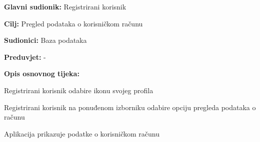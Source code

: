 				
				\noindent {}
				\begin{packed_item}
					
					\item \textbf{Glavni sudionik:} Registrirani korisnik
					\item  \textbf{Cilj:} Pregled podataka o korisničkom računu
					\item  \textbf{Sudionici:} Baza podataka
					\item  \textbf{Preduvjet:} -
					
					\item  \textbf{Opis osnovnog tijeka:}
					\item[] \begin{packed_enum}
						\item Registrirani korisnik odabire ikonu svojeg profila
						\item Registrirani korisnik na ponuđenom izborniku odabire opciju pregleda podataka o računu
						\item Aplikacija prikazuje podatke o korisničkom računu
					\end{packed_enum}
				\end{packed_item}
				
